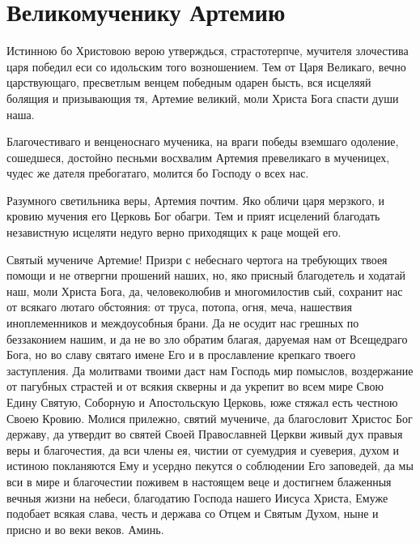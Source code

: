 \section{Великомученику Артемию}\begin{mymulticols}


Истинною бо Христовою верою утверждься, страстотерпче, мучителя злочестива царя победил еси со идольским того возношением. Тем от Царя Великаго, вечно царствующаго, пресветлым венцем победным одарен бысть, вся исцеляяй болящия и призывающия тя, Артемие великий, моли Христа Бога спасти души наша.


Благочестиваго и венценоснаго мученика, на враги победы вземшаго одоление, сошедшеся, достойно песньми восхвалим Артемия превеликаго в мученицех, чудес же дателя пребогатаго, молится бо Господу о всех нас.


Разумного светильника веры, Артемия почтим. Яко обличи царя мерзкого, и кровию мучения его Церковь Бог обагри. Тем и прият исцелений благодать независтную исцеляти недуго верно приходящих к раце мощей его.


Святый мучениче Артемие! Призри с небеснаго чертога на требующих твоея помощи и не отвергни прошений наших, но, яко присный благодетель и ходатай наш, моли Христа Бога, да, человеколюбив и многомилостив сый, сохранит нас от всякаго лютаго обстояния: от труса, потопа, огня, меча, нашествия иноплеменников и междоусобныя брани. Да не осудит нас грешных по беззаконием нашим, и да не во зло обратим благая, даруемая нам от Всещедраго Бога, но во славу святаго имене Его и в прославление крепкаго твоего заступления. Да молитвами твоими даст нам Господь мир помыслов, воздержание от пагубных страстей и от всякия скверны и да укрепит во всем мире Свою Едину Святую, Соборную и Апостольскую Церковь, юже стяжал есть честною Своею Кровию. Молися прилежно, святий мучениче, да благословит Христос Бог державу, да утвердит во святей Своей Православней Церкви живый дух правыя веры и благочестия, да вси члены ея, чистии от суемудрия и суеверия, духом и истиною покланяются Ему и усердно пекутся о соблюдении Его заповедей, да мы вси в мире и благочестии поживем в настоящем веце и достигнем блаженныя вечныя жизни на небеси, благодатию Господа нашего Иисуса Христа, Емуже подобает всякая слава, честь и держава со Отцем и Святым Духом, ныне и присно и во веки веков. Аминь.

\end{mymulticols}

